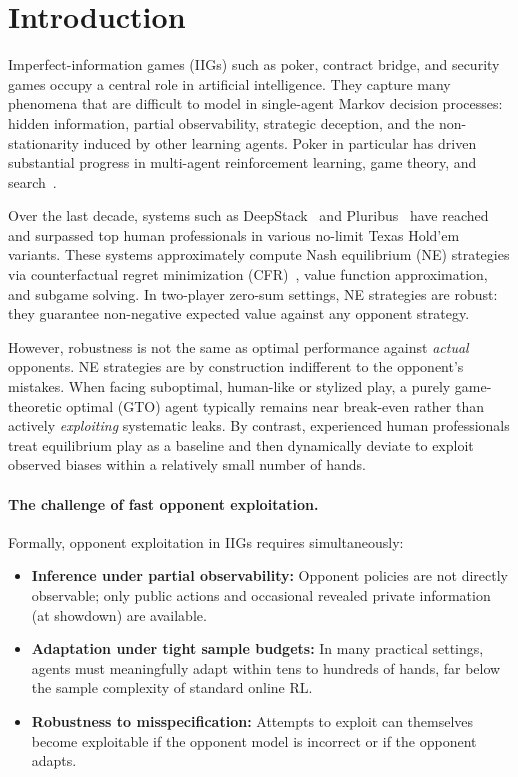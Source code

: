 \documentclass{article}
\begin{document}
\section{Introduction}
\label{sec:intro}

Imperfect-information games (IIGs) such as poker, contract bridge, and security games occupy a central role in artificial intelligence. They capture many phenomena that are difficult to model in single-agent Markov decision processes: hidden information, partial observability, strategic deception, and the non-stationarity induced by other learning agents. Poker in particular has driven substantial progress in multi-agent reinforcement learning, game theory, and search~\citep{neller2013cfrintro,heinrich2016nfsp,brown2019deepcfr}.

Over the last decade, systems such as DeepStack~\citep{moravcik2017deepstack} and Pluribus~\citep{brown2019superhuman} have reached and surpassed top human professionals in various no-limit Texas Hold'em variants. These systems approximately compute Nash equilibrium (NE) strategies via counterfactual regret minimization (CFR)~\citep{zinkevich2008cfr,gibson2012mccfr,brown2019deepcfr}, value function approximation, and subgame solving. In two-player zero-sum settings, NE strategies are robust: they guarantee non-negative expected value against any opponent strategy.

However, robustness is not the same as optimal performance against \emph{actual} opponents. NE strategies are by construction indifferent to the opponent's mistakes. When facing suboptimal, human-like or stylized play, a purely game-theoretic optimal (GTO) agent typically remains near break-even rather than actively \emph{exploiting} systematic leaks. By contrast, experienced human professionals treat equilibrium play as a baseline and then dynamically deviate to exploit observed biases within a relatively small number of hands.

\paragraph{The challenge of fast opponent exploitation.}
Formally, opponent exploitation in IIGs requires simultaneously:
\begin{itemize}[leftmargin=*]
    \item \textbf{Inference under partial observability:} Opponent policies are not directly observable; only public actions and occasional revealed private information (at showdown) are available.
    \item \textbf{Adaptation under tight sample budgets:} In many practical settings, agents must meaningfully adapt within tens to hundreds of hands, far below the sample complexity of standard online RL.
    \item \textbf{Robustness to misspecification:} Attempts to exploit can themselves become exploitable if the opponent model is incorrect or if the opponent adapts.
\end{itemize}
\end{document}
